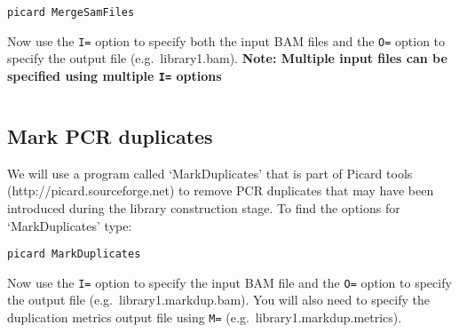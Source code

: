 \documentclass[11pt]{article}
\makeatletter
\newcommand{\boxspacing}{\kern\kvtcb@left@rule\kern\kvtcb@boxsep}
\newcommand{\prompt}[4]{
        \ttfamily\llap{{\color{#2}[#3]:\hspace{3pt}#4}}\vspace{-\baselineskip}
    }
\makeatother
\begin{document}
    \begin{tcolorbox}[breakable, size=fbox, boxrule=1pt, pad at break*=1mm,colback=cellbackground, colframe=cellborder]
\prompt{In}{incolor}{ }{\boxspacing}
\begin{Verbatim}[commandchars=\\\{\}]
picard MergeSamFiles
\end{Verbatim}
\end{tcolorbox}

    Now use the \texttt{I=} option to specify both the input BAM files and
the \texttt{O=} option to specify the output file (e.g.~library1.bam).
\textbf{Note: Multiple input files can be specified using multiple
\texttt{I=} options}

    \begin{tcolorbox}[breakable, size=fbox, boxrule=1pt, pad at break*=1mm,colback=cellbackground, colframe=cellborder]
\prompt{In}{incolor}{ }{\boxspacing}
\begin{Verbatim}[commandchars=\\\{\}]

\end{Verbatim}
\end{tcolorbox}

    \hypertarget{mark-pcr-duplicates}{%
\subsection{Mark PCR duplicates}\label{mark-pcr-duplicates}}

We will use a program called `MarkDuplicates' that is part of Picard
tools (http://picard.sourceforge.net) to remove PCR duplicates that may
have been introduced during the library construction stage. To find the
options for `MarkDuplicates' type:

    \begin{tcolorbox}[breakable, size=fbox, boxrule=1pt, pad at break*=1mm,colback=cellbackground, colframe=cellborder]
\prompt{In}{incolor}{ }{\boxspacing}
\begin{Verbatim}[commandchars=\\\{\}]
picard MarkDuplicates
\end{Verbatim}
\end{tcolorbox}

    Now use the \texttt{I=} option to specify the input BAM file and the
\texttt{O=} option to specify the output file
(e.g.~library1.markdup.bam). You will also need to specify the
duplication metrics output file using \texttt{M=}
(e.g.~library1.markdup.metrics).
\end{document}
